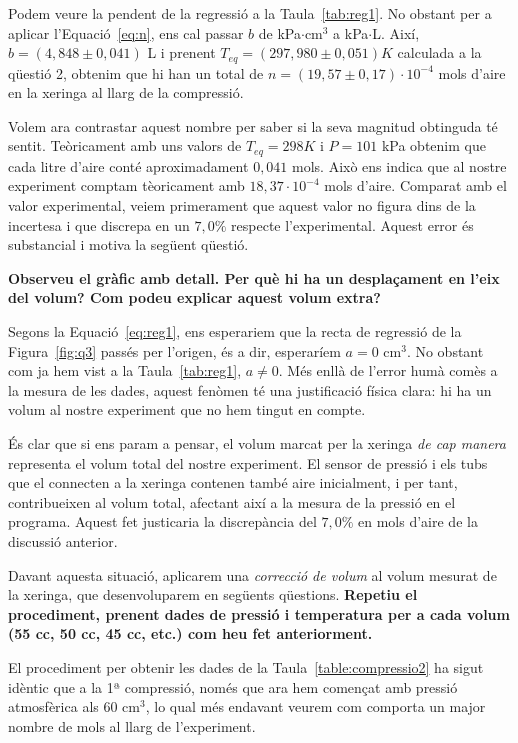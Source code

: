 \documentclass[a4paper,twoside,12pt]{article}
\theoremstyle{definition}
\begin{document}
	Podem veure la pendent de la regressió a la Taula~\ref{tab:reg1}. No obstant per a aplicar l'Equació~\ref{eq:n}, ens cal passar $b$ de kPa$\cdot$cm$^3$ a kPa$\cdot$L. Així, $b = (4,848\pm0,041)$ L i prenent $T_{eq} = (297,980 \pm 0,051) K$ calculada a la qüestió 2, obtenim que hi han un total de $n = (19,57 \pm 0,17) \cdot 10^{-4}$ mols d'aire en la xeringa al llarg de la compressió. 
	
	Volem ara contrastar aquest nombre per saber si la seva magnitud obtinguda té sentit. Teòricament amb uns valors de $T_{eq} = 298 K$ i  $P = 101$ kPa obtenim que cada litre d'aire conté aproximadament $0,041$ mols.
	Això ens indica que al nostre experiment comptam tèoricament amb $18,37 \cdot 10^{-4}$ mols d'aire. Comparat amb el valor experimental, veiem primerament que aquest valor no figura dins de la incertesa i que discrepa en un $7,0\%$ respecte l'experimental. Aquest error és substancial i motiva la següent qüestió.
	
	\textbf{Observeu el gràfic amb detall. Per què hi ha un desplaçament en l’eix del volum? Com
		podeu explicar aquest volum extra?}
	
	Segons la Equació~\ref{eq:reg1}, ens esperariem que la recta de regressió de la Figura~\ref{fig:q3} passés per l'origen, és a dir, esperaríem $a = 0$ cm$^{3}$. No obstant com ja hem vist a la Taula~\ref{tab:reg1}, $a \neq 0$. Més enllà de l'error humà comès a la mesura de les dades, aquest fenòmen té una justificació física clara: hi ha un volum al nostre experiment que no hem tingut en compte.
	
	És clar que si ens param a pensar, el volum marcat per la xeringa \textit{de cap manera} representa el volum total del nostre experiment. El sensor de pressió i els tubs que el connecten a la xeringa contenen també aire inicialment, i per tant, contribueixen al volum total, afectant així a la mesura de la pressió en el programa. Aquest fet justicaria la discrepància del $7,0\%$ en mols d'aire de la discussió anterior.
	
	Davant aquesta situació, aplicarem una \textit{correcció de volum} al volum mesurat de la xeringa, que desenvoluparem en següents qüestions.
	\newpage
	\textbf{Repetiu el procediment, prenent dades de pressió i temperatura per a cada volum (55 cc,
		50 cc, 45 cc, etc.) com heu fet anteriorment.}
		
	El procediment per obtenir les dades de la Taula~\ref{table:compressio2} ha sigut idèntic que a la 1ª compressió, només que ara hem començat amb pressió atmosfèrica als 60 cm$^3$, lo qual més endavant veurem com comporta un major nombre de mols al llarg de l'experiment.
	
\end{document}
